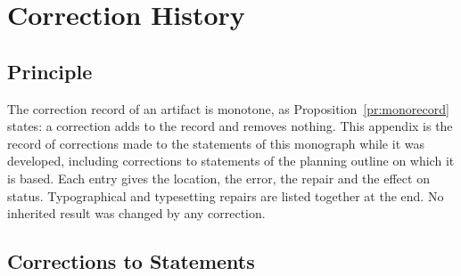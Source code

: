 \documentclass[11pt,letterpaper]{report}
\theoremstyle{plain}
\theoremstyle{definition}
\theoremstyle{remark}
\begin{document}
\chapter{Correction History}

\section{Principle}

The correction record of an artifact is monotone, as Proposition~\ref{pr:monorecord} states: a correction adds to the record and removes nothing. This appendix is the record of corrections made to the statements of this monograph while it was developed, including corrections to statements of the planning outline on which it is based. Each entry gives the location, the error, the repair and the effect on status. Typographical and typesetting repairs are listed together at the end. No inherited result was changed by any correction.

\section{Corrections to Statements}
\end{document}
